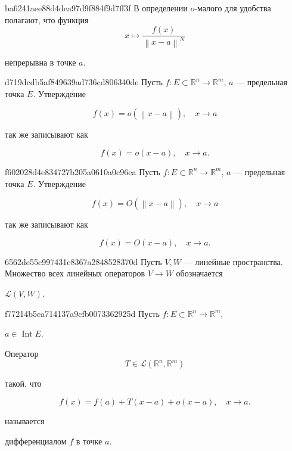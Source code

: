 \begin{note}{ba6241aee88d4dea97d9f884f9d7ff3f}
    В определении \({ o }\)-малого для удобства полагают, что функция
    \[
        x \mapsto \frac{f(x)}{\left\lVert x - a \right\rVert^{N}}
    \]
    \begin{icloze}{1}непрерывна в точке \({ a }\).\end{icloze}
\end{note}

\begin{note}{d719dcdb5af849639ad736cd806340de}
    Пусть \({ f : E \subset \mathbb R^{n} \to \mathbb R^{m} }\), \({ a }\) --- предельная точка \({ E }\).
    Утверждение
    \begin{icloze}{2}
        \[
            f(x) = o(\left\lVert x - a \right\rVert), \quad x \to a
        \]
    \end{icloze}
    так же записывают как
    \begin{icloze}{1}
        \[
            f(x) = o(x - a), \quad x \to a.
        \]
    \end{icloze}
\end{note}

\begin{note}{f602028d4e834727b205a0610a0c96ea}
    Пусть \({ f : E \subset \mathbb R^{n} \to \mathbb R^{m} }\), \({ a }\) --- предельная точка \({ E }\).
    Утверждение
    \begin{icloze}{2}
        \[
            f(x) = O(\left\lVert x - a \right\rVert), \quad x \to a
        \]
    \end{icloze}
    так же записывают как
    \begin{icloze}{1}
        \[
            f(x) = O(x - a), \quad x \to a.
        \]
    \end{icloze}
\end{note}

\begin{note}{6562de55c997431e8367a2848528370d}
    Пусть \({ V, W }\) --- линейные пространства.
    Множество всех линейных операторов \({ V \to W }\) обозначается \begin{icloze}{1}\({ \mathcal L(V, W) }\).\end{icloze}
\end{note}

\begin{note}{f77214b5ea714137a9cfb0073362925d}
    Пусть \({ f : E  \subset \mathbb R^{n} \to \mathbb R^{m} }\), \begin{icloze}{4}\({ a \in \operatorname{Int} E }\).\end{icloze}
    \begin{icloze}{3}Оператор
        \[
            T \in \mathcal L(\mathbb R^{n}, \mathbb R^{m})
        \]
    \end{icloze} такой, что
    \begin{icloze}{2}
        \[
            f(x) = f(a) + T(x - a) + o(x - a), \quad x \to a.
        \]
    \end{icloze}
    называется \begin{icloze}{1}дифференциалом \({ f }\) в точке \({ a }\).\end{icloze}
\end{note}

